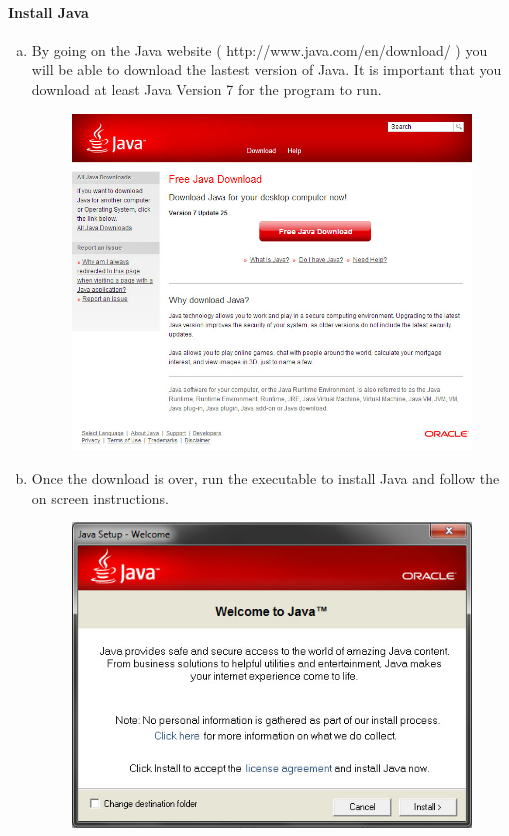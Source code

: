 \documentclass{article}
\begin{document}
\paragraph{Install Java \\}
\begin{enumerate}[(a)]
  \item By going on the Java website ( http://www.java.com/en/download/ ) you will be able to download the lastest version of Java. It is important that you download at least Java Version 7 for the program to run.
	\begin{figure}[!htb]
	\centering
	\includegraphics[scale=0.55]{images/javaInstall1.jpg}
	\end{figure}
\pagebreak
  \item Once the download is over, run the executable to install Java and follow the on screen instructions.
	\begin{figure}[!htb]
	\centering
	\includegraphics[scale=0.55]{images/javaInstall2.jpg}

\end{figure}
\end{enumerate}
\end{document}
